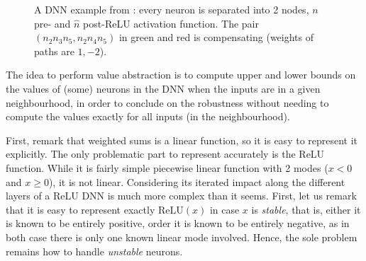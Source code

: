 \documentclass{llncs}
\newcommand{\ReLU}{\mathrm{ReLU}}
\begin{document}
\begin{figure}[t!]
	\caption{A DNN example from \cite{kpoly}: every neuron is separated into 2 nodes, $n$ pre- and $\hat{n}$ post-ReLU activation function. The pair $(n_2 n_3 n_5,n_2 n_4 n_5)$ in green and red is compensating (weights of paths are $1,-2$).}
	\label{fig1}
\end{figure}

The idea to perform value abstraction is to compute upper and lower bounds on the values of (some) neurons in the DNN when the inputs are in a given neighbourhood, in order to conclude on the robustness without needing to compute the values exactly for all inputs (in the neighbourhood).

First, remark that weighted sums is a linear function, so it is easy to represent it explicitly. The only problematic part to represent accurately is the ReLU function. While it is fairly simple piecewise linear function with 2 modes ($x<0$ and $x \geq 0$), it is not linear. Considering its iterated impact along the different layers of a ReLU DNN is much more complex than it seems. First, let us remark that it is easy to represent exactly $\ReLU(x)$ in case $x$ is {\em stable}, that is, either it is known to be entirely positive, order
it is known to be entirely negative, as in both case there is only one known linear mode involved. Hence, the sole problem remains how to handle {\em unstable} neurons.
\end{document}

